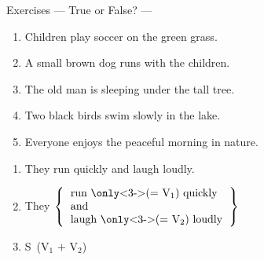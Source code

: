 \documentclass[aspectratio=169, xcolor={dvipsnames,table}]{beamer}
\begin{document}
\begin{frame}[plain,t]{Exercises --- True or False? ---}
\begin{enumerate}
      \item<2-> Children play soccer on the green grass.\hfill{}

      \item<2-> A small brown dog runs with the children.\hfill{}

      \item<2-> The old man is sleeping under the tall tree.\hfill{}

      \item<2-> Two black birds swim slowly in the lake.\hfill{}

      \item<2-> Everyone enjoys the peaceful morning in nature.\hfill{}
    \end{enumerate}
  \end{frame}
  \begin{frame}[plain]
    \hypertarget{AND}{}
    \begin{enumerate}
      \setlength{\itemsep}{10pt}

      \item<1-> They run quickly and laugh loudly.

      \item<2-> They  $\left\{
        \begin{tabular}{l}
          run \only<3->{($=$ V$_{1}$)} quickly  \\
          and                                   \\
          laugh \only<3->{($=$ V$_{2}$)} loudly
        \end{tabular}
        \right\}$

      \item<4> S\,\,\,(V$_{1}$ $+$ V$_{2}$)
    \end{enumerate}
    \hfill\hyperlink{reader}{}
  \end{frame}
\end{document}
